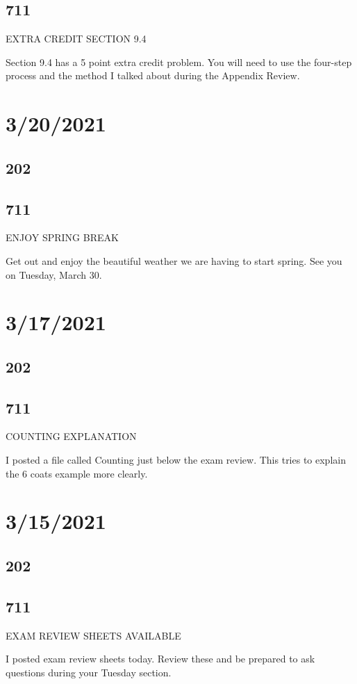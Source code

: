 \documentclass[]{article}
\begin{document}
\subsection*{711}
EXTRA CREDIT SECTION 9.4

Section 9.4 has a 5 point extra credit problem. You will need to use the four-step process and the method I talked about during the Appendix Review.

\section*{3/20/2021}
\subsection*{202}
\subsection*{711}
ENJOY SPRING BREAK

Get out and enjoy the beautiful weather we are having to start spring. See you on Tuesday, March 30.

\section*{3/17/2021}
\subsection*{202}
\subsection*{711}
COUNTING EXPLANATION

I posted a file called Counting just below the exam review. This tries to explain the 6 coats example more clearly.

\section*{3/15/2021}
\subsection*{202}
\subsection*{711}
EXAM REVIEW SHEETS AVAILABLE

I posted exam review sheets today. Review these and be prepared to ask questions during your Tuesday section.
\end{document}
